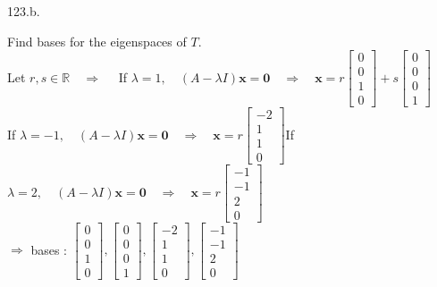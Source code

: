 \documentclass[12pt]{book}
\begin{document}
\begin{CJK}{UTF8}{bsmi}
123.b. \begin{minipage}[t]{\dimexpr\linewidth-2em}
Find bases for the eigenspaces of $T$. \\
Let $r, s\in\mathbb{R}\quad\Rightarrow\quad$ If $\lambda=1,\quad(A-\lambda I)\textbf{x}=\textbf{0}\quad\Rightarrow\quad\textbf{x}=r\begin{bmatrix}
0\\0\\1\\0
\end{bmatrix}+s\begin{bmatrix}
0\\0\\0\\1
\end{bmatrix}$ \\
If $\lambda=-1,\quad(A-\lambda I)\textbf{x}=\textbf{0}\quad\Rightarrow\quad\textbf{x}=r\begin{bmatrix}
-2\\1\\1\\0
\end{bmatrix}$\quad If $\lambda=2,\quad(A-\lambda I)\textbf{x}=\textbf{0}\quad\Rightarrow\quad\textbf{x}=r\begin{bmatrix}
-1\\-1\\2\\0
\end{bmatrix}$ \\
$\Rightarrow$ bases : $\begin{bmatrix}
0\\0\\1\\0
\end{bmatrix}, \begin{bmatrix}
0\\0\\0\\1
\end{bmatrix}, \begin{bmatrix}
-2\\1\\1\\0
\end{bmatrix}, \begin{bmatrix}
-1\\-1\\2\\0
\end{bmatrix}$
\end{minipage}\\

\end{CJK}
\end{document}
